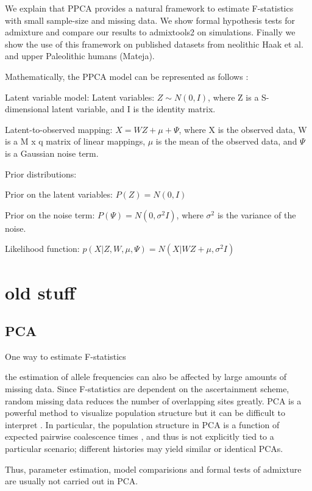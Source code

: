 \documentclass[12pt, letterpaper]{article}
\begin{document}
We explain that PPCA provides a natural framework to estimate F-statistics with small sample-size and missing data. We show formal hypothesis tests for admixture and compare our results to admixtools2 \cite{maier_limits_2022} on simulations. Finally we show the use of this framework on published datasets from neolithic Haak et al. and upper Paleolithic humans (Mateja). 

Mathematically, the PPCA model can be represented as follows \cite{tipping_probabilistic_nodate}:

Latent variable model:
Latent variables: $Z \sim N(0, I)$, where Z is a S-dimensional latent variable, and I is the identity matrix.

Latent-to-observed mapping: $X = WZ + \mu + \Psi$, where X is the observed data, W is a M x q matrix of linear mappings, $\mu$ is the mean of the observed data, and $\Psi$ is a Gaussian noise term.

Prior distributions:

Prior on the latent variables: $P(Z) = N(0, I)$

Prior on the noise term: $P(\Psi) = N(0, \sigma^2I)$, where $\sigma^2$ is the variance of the noise.

Likelihood function:
$p(X|Z, W, \mu, \Psi) = N(X|WZ + \mu, \sigma^2I)$

\section{old stuff}
\subsection{PCA}

One way to estimate F-statistics 

the estimation of allele frequencies can also be affected by large amounts of missing data. Since F-statistics are dependent on the ascertainment scheme, random missing data reduces the number of overlapping sites greatly.
PCA is a powerful method to visualize population structure but it can be difficult to interpret \citep{cavalli-sforza1993, novembre_stephens_2008, degiorgio_rosenberg2013}. In particular, the population structure in PCA is a function of expected pairwise coalescence times \citep{mcvean_genealogical_2009}, and thus is not explicitly tied to a particular scenario; different histories may yield similar or identical PCAs. 

Thus, parameter estimation, model comparisions and formal tests of admixture are usually not carried out in PCA. 
\end{document}
